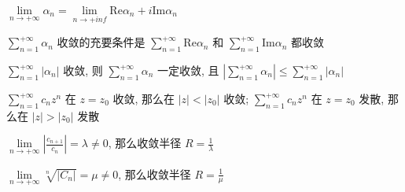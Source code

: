 \documentclass[UTF8, 12pt]{ctexart}
\begin{document}
	$ \lim\limits_{n \to +\infty}\alpha_{n} = \lim\limits_{n \to +inf} \mathrm{Re}\alpha_{n} + i\mathrm{Im}\alpha_{n} $

	$ \sum\limits_{n=1}^{+\infty}\alpha_{n} $ 收敛的充要条件是 $ \sum\limits_{n=1}^{+\infty}\mathrm{Re}\alpha_{n} $ 和 $ \sum\limits_{n=1}^{+\infty}\mathrm{Im}\alpha_{n} $ 都收敛

	$ \sum\limits_{n=1}^{+\infty}|\alpha_{n}| $ 收敛, 则 $ \sum\limits_{n=1}^{+\infty}\alpha_{n} $ 一定收敛, 且 $ |\sum\limits_{n=1}^{+\infty}\alpha_{n}| \leq \sum\limits_{n=1}^{+\infty}|\alpha_{n}| $

	$ \sum\limits_{n=1}^{+\infty}c_{n}z^{n} $ 在 $ z = z_{0} $ 收敛, 那么在 $ |z| < |z_{0}| $ 收敛; $ \sum\limits_{n=1}^{+\infty}c_{n}z^{n} $ 在 $ z = z_{0} $ 发散, 那么在 $ |z| > |z_{0}| $ 发散

	$ \lim\limits_{n \to +\infty}\left|\frac{c_{n+1}}{c_{n}}\right| = \lambda \neq 0 $, 那么收敛半径 $ R = \frac{1}{\lambda} $

	$ \lim\limits_{n \to +\infty}\sqrt[n]{|C_{n}|} = \mu \neq 0 $, 那么收敛半径 $ R = \frac{1}{\mu} $
\end{document}

